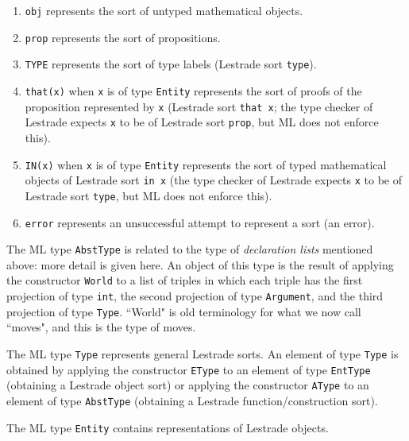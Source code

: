 \documentclass{article}
\begin{document}
\begin{enumerate}

\item {\tt obj} represents the sort of untyped mathematical objects.

\item  {\tt prop} represents the sort of propositions.

\item {\tt TYPE} represents the sort of type labels (Lestrade sort {\tt type}).

\item  {\tt that(x)} when {\tt x} is of type {\tt Entity} represents the sort of proofs of the proposition represented by {\tt x} (Lestrade sort {\tt that x};  the type checker of Lestrade expects {\tt x} to be of Lestrade sort {\tt prop}, but ML does not enforce this).

\item  {\tt IN(x)} when {\tt x} is of type {\tt Entity} represents the sort of typed mathematical objects of Lestrade sort  {\tt in  x} (the type checker of Lestrade expects {\tt x} to be of Lestrade sort {\tt type}, but ML does not enforce this).

\item {\tt error} represents an unsuccessful attempt to represent a sort (an error).

\end{enumerate}

The ML type {\tt AbstType} is related to the type of {\em declaration lists\/} mentioned above:  more detail is given here.  An object of this type is the result of applying the constructor {\tt World} to a list of triples in which each triple has the first projection of type {\tt int}, the second projection of type {\tt Argument}, and the third projection  of type {\tt Type}.  ``World" is old terminology for what we now call ``moves", and this is the type of
moves.

The ML type {\tt Type} represents general Lestrade sorts.  An element of type {\tt Type} is obtained by applying the constructor {\tt EType} to an element
of type {\tt EntType} (obtaining a Lestrade object sort) or applying the constructor {\tt AType} to an element of type {\tt AbstType} (obtaining a Lestrade function/construction sort).

The ML type {\tt Entity} contains representations of Lestrade objects.
\end{document}
